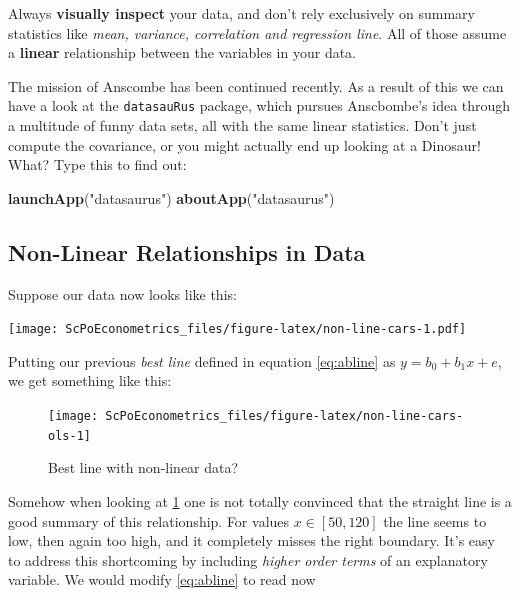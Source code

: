 \documentclass[]{book}
\newenvironment{Shaded}{\begin{snugshade}}{\end{snugshade}}
\newcommand{\KeywordTok}[1]{\textcolor[rgb]{0.13,0.29,0.53}{\textbf{#1}}}
\newcommand{\StringTok}[1]{\textcolor[rgb]{0.31,0.60,0.02}{#1}}
\newcommand{\NormalTok}[1]{#1}
\newenvironment{warning}{\begin{tcolorbox}[colback=orange!5!white,colframe=orange,title=\textbf{Warning!}]}{\end{tcolorbox}}
\theoremstyle{definition}
\theoremstyle{definition}
\theoremstyle{definition}
\theoremstyle{remark}
\begin{document}
\begin{warning}
Always \textbf{visually inspect} your data, and don't rely exclusively
on summary statistics like \emph{mean, variance, correlation and
regression line}. All of those assume a \textbf{linear} relationship
between the variables in your data.
\end{warning}

 The mission of Anscombe has been continued recently. As a result of
this we can have a look at the \texttt{datasauRus} package, which
pursues Anscbombe's idea through a multitude of funny data sets, all
with the same linear statistics. Don't just compute the covariance, or
you might actually end up looking at a Dinosaur! What? Type this to find
out:

\begin{Shaded}
\begin{Highlighting}[]
\KeywordTok{launchApp}\NormalTok{(}\StringTok{"datasaurus"}\NormalTok{)}
\KeywordTok{aboutApp}\NormalTok{(}\StringTok{"datasaurus"}\NormalTok{)}
\end{Highlighting}
\end{Shaded}

\subsection{Non-Linear Relationships in
Data}\label{non-linear-relationships-in-data}

Suppose our data now looks like this:

\texttt{[image: ScPoEconometrics\_files/figure-latex/non-line-cars-1.pdf]}

Putting our previous \emph{best line} defined in equation
\eqref{eq:abline} as \(y = b_0 + b_1 x + e\), we get something like this:

\begin{figure}

{\centering \texttt{[image: ScPoEconometrics\_files/figure-latex/non-line-cars-ols-1]} 

}

\caption{Best line with non-linear data?}\label{fig:non-line-cars-ols}
\end{figure}

Somehow when looking at \ref{fig:non-line-cars-ols} one is not totally
convinced that the straight line is a good summary of this relationship.
For values \(x\in[50,120]\) the line seems to low, then again too high,
and it completely misses the right boundary. It's easy to address this
shortcoming by including \emph{higher order terms} of an explanatory
variable. We would modify \eqref{eq:abline} to read now
\end{document}
